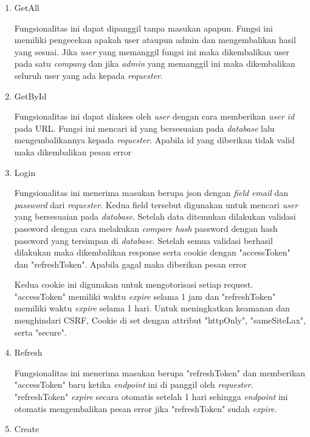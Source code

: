 \begin{enumerate}
    \item GetAll

          Fungsionalitas ini dapat dipanggil tanpa masukan apapun. Fungsi ini memiliki pengecekan apakah user ataupun admin dan mengembalikan hasil yang sesuai. Jika \textit{user} yang memanggil fungsi ini maka dikembalikan user pada satu \textit{company} dan jika \textit{admin} yang memanggil ini maka dikembalikan seluruh user yang ada kepada \textit{requester}.

    \item GetById

          Fungsionalitas ini dapat diakses oleh \textit{user} dengan cara memberikan \textit{user id} pada URL. Fungsi ini mencari id yang bersesuaian pada \textit{database} lalu mengembalikannya kepada \textit{requester}. Apabila id yang diberikan tidak valid maka dikembalikan pesan error

    \item Login

          Fungsionalitas ini menerima masukan berupa json dengan \textit{field} \textit{email} dan \textit{password} dari \textit{requester}. Kedua field tersebut digunakan untuk mencari \textit{user} yang bersesuaian pada \textit{database}. Setelah data ditemukan dilakukan validasi password dengan cara melakukan \textit{compare hash} password dengan hash password yang tersimpan di \textit{database}. Setelah semua validasi berhasil dilakukan maka dikembalikan response serta cookie dengan "accessToken" dan "refreshToken". Apabila gagal maka diberikan pesan error

          Kedua cookie ini digunakan untuk mengotorisasi setiap request. "accessToken" memiliki waktu \textit{expire} selama 1 jam dan "refreshToken" memiliki waktu \textit{expire} selama 1 hari. Untuk meningkatkan keamanan dan menghindari CSRF, Cookie di set dengan attribut "httpOnly", "sameSiteLax", serta "secure".

    \item Refresh

          Fungsionalitas ini menerima masukan berupa "refreshToken" dan memberikan "accessToken" baru ketika \textit{endpoint} ini di panggil oleh \textit{requester}. "refreshToken" \textit{expire} secara otomatis setelah 1 hari sehingga \textit{endpoint} ini otomatis mengembalikan pesan error jika "refreshToken" sudah \textit{expire}.

    \item Create


\end{enumerate}
